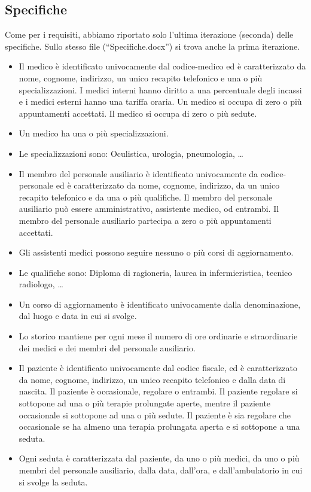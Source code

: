 \documentclass[11pt]{article}
\begin{document}
\subsection{Specifiche}
Come per i requisiti, abbiamo riportato solo l'ultima iterazione (seconda) delle specifiche.
Sullo stesso file (``Specifiche.docx'') si trova anche la prima iterazione.
\begin{itemize}
    \item Il medico è identificato univocamente dal codice-medico ed è caratterizzato da nome, cognome, indirizzo, un unico recapito telefonico e una o più specializzazioni. I medici interni hanno diritto a una percentuale degli incassi e i medici esterni hanno una tariffa oraria. Un medico si occupa di zero o più appuntamenti accettati. Il medico si occupa di zero o più sedute.
    \item Un medico ha una o più specializzazioni.
    \item Le specializzazioni sono: Oculistica, urologia, pneumologia, …
    \item Il membro del personale ausiliario è identificato univocamente da codice-personale ed è caratterizzato da nome, cognome, indirizzo, da un unico recapito telefonico e da una o più qualifiche. Il membro del personale ausiliario può essere amministrativo, assistente medico, od entrambi. Il membro del personale ausiliario partecipa a zero o più appuntamenti accettati.
    \item Gli assistenti medici possono seguire nessuno o più corsi di aggiornamento.
    \item Le qualifiche sono: Diploma di ragioneria, laurea in infermieristica, tecnico radiologo, …
    \item Un corso di aggiornamento è identificato univocamente dalla denominazione, dal luogo e data in cui si svolge.
    \item Lo storico mantiene per ogni mese il numero di ore ordinarie e straordinarie dei medici e dei membri del personale ausiliario.
    \item Il paziente è identificato univocamente dal codice fiscale, ed è caratterizzato da nome, cognome, indirizzo, un unico recapito telefonico e dalla data di nascita. Il paziente è occasionale, regolare o entrambi. Il paziente regolare si sottopone ad una o più terapie prolungate aperte, mentre il paziente occasionale si sottopone ad una o più sedute. Il paziente è sia regolare che occasionale se ha almeno una terapia prolungata aperta e si sottopone a una seduta.
    \item Ogni seduta è caratterizzata dal paziente, da uno o più medici, da uno o più membri del personale ausiliario, dalla data, dall’ora, e dall’ambulatorio in cui si svolge la seduta.

\end{itemize}
\end{document}
